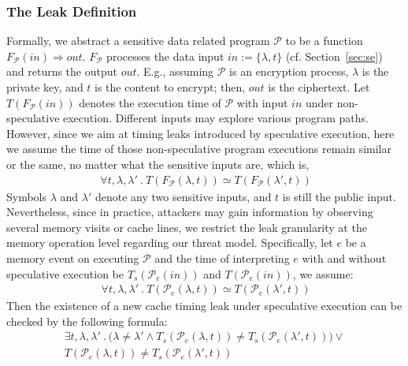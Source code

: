 \documentclass[sigconf]{acmart}
\newcommand{\prog}{\mathcal{P}}
\begin{document}
\subsubsection{The Leak Definition}

Formally, we abstract a sensitive data related program $\prog$ to be a function 
$\mathit{F_{\prog}(in)\Rightarrow out}$. $\mathit{F_{\prog}}$ processes the data 
input $\mathit{in}:=\{\lambda,t\}$ (cf. Section~\ref{sec:se}) and returns the 
output $\mathit{out}$. E.g., assuming $\prog$ is an encryption process, $\lambda$ 
is the private key, and $t$ is the content to encrypt; then, $out$ is the ciphertext. 
Let $T(F_{\prog}(in))$ denotes the execution time of $\prog$ with input $\mathit{in}$ 
under non-speculative execution. Different inputs may explore various program paths. 
However, since we aim at timing leaks introduced by speculative execution, here we 
assume the time of those non-speculative program executions remain similar or the 
same, no matter what the sensitive inputs are, which is, 
%
\begin{multline} 
  \label{lb:no_leak_event}
  ~~~~~\mathit{\forall t,\lambda,\lambda'~.~T(F_{\prog}(\lambda,t)) \simeq 
  T(F_{\prog}(\lambda',t))}~~~~
\end{multline} 
%
Symbols $\lambda$ and $\lambda'$ denote any two sensitive inputs, and $t$ is still 
the public input. Nevertheless, since in practice, attackers may gain information 
by observing several memory visits or cache lines, we restrict the leak granularity 
at the memory operation level regarding our threat model. Specifically, let $\mathit{e}$ 
be a memory event on executing $\prog$ and the time of interpreting $\mathit{e}$ with 
and without speculative execution be 
$\mathit{T_{s}(\prog_e(in))}$ and $\mathit{T(\prog_e(in))}$, we assume:
%
\begin{multline} 
  \label{lb:no_leak_event}
  ~~~~~\mathit{\forall t,\lambda,\lambda'~.~T(\prog_e(\lambda,t)) \simeq 
  T(\prog_e(\lambda',t))}~~~~
\end{multline} 
%
Then the existence of a new cache timing leak under speculative execution can be 
checked by the following formula: 
%
\begin{multline}
\label{lb:specu_leak}
\mathit{\exists t,\lambda,\lambda'~.~
	\big(
			\lambda \neq \lambda' \wedge T_{s}({\prog_e}(\lambda,t)) 
			\neq T_{s}({\prog_e}(\lambda',t))}
	\big)
	\vee 
	\\  
	T({\prog_e}(\lambda,t)) \neq T_{s}({\prog_e}(\lambda',t)) ~~~
\end{multline}
\end{document}
